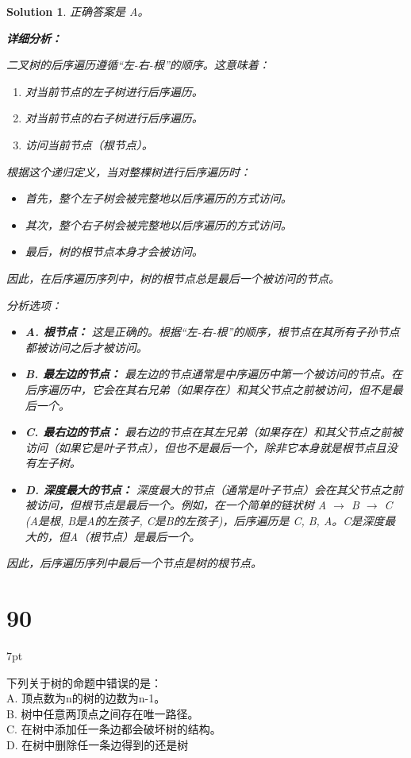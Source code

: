 \documentclass[UTF8]{report}
\newtheorem{solution}{Solution}
\theoremstyle{MyLineTheoremStyle} %
\theoremstyle{MyBlockTheoremStyle} %
\theoremstyle{MySubsubsectionStyle} %
\newenvironment{graybox}{%
        \def\FrameCommand{%
        \hspace{1pt}%
        {\color{gray}\small \vrule width 2pt}%
        {\color{graybox_color}\vrule width 4pt}%
        \colorbox{graybox_color}%
        }%
        \MakeFramed{\advance\hsize-\width\FrameRestore}%
        \noindent\hspace{-4.55pt}%
        \begin{adjustwidth}{}{7pt}%
        \vspace{2pt}\vspace{2pt}%
        }
        {%
        \vspace{2pt}\end{adjustwidth}\endMakeFramed%
        }
\begin{document}
\begin{solution}
正确答案是 A。

\textbf{详细分析：}

二叉树的后序遍历遵循“左-右-根”的顺序。这意味着：
\begin{enumerate}
    \item 对当前节点的左子树进行后序遍历。
    \item 对当前节点的右子树进行后序遍历。
    \item 访问当前节点（根节点）。
\end{enumerate}

根据这个递归定义，当对整棵树进行后序遍历时：
\begin{itemize}
    \item 首先，整个左子树会被完整地以后序遍历的方式访问。
    \item 其次，整个右子树会被完整地以后序遍历的方式访问。
    \item 最后，树的根节点本身才会被访问。
\end{itemize}
因此，在后序遍历序列中，树的根节点总是最后一个被访问的节点。

分析选项：
\begin{itemize}
    \item \textbf{A. 根节点：} 这是正确的。根据“左-右-根”的顺序，根节点在其所有子孙节点都被访问之后才被访问。
    \item \textbf{B. 最左边的节点：} 最左边的节点通常是中序遍历中第一个被访问的节点。在后序遍历中，它会在其右兄弟（如果存在）和其父节点之前被访问，但不是最后一个。
    \item \textbf{C. 最右边的节点：} 最右边的节点在其左兄弟（如果存在）和其父节点之前被访问（如果它是叶子节点），但也不是最后一个，除非它本身就是根节点且没有左子树。
    \item \textbf{D. 深度最大的节点：} 深度最大的节点（通常是叶子节点）会在其父节点之前被访问，但根节点是最后一个。例如，在一个简单的链状树 A $\rightarrow$ B $\rightarrow$ C (A是根, B是A的左孩子, C是B的左孩子)，后序遍历是 C, B, A。C是深度最大的，但A（根节点）是最后一个。
\end{itemize}

因此，后序遍历序列中最后一个节点是树的根节点。
\end{solution}


\section*{90}
\begin{graybox}
下列关于树的命题中错误的是： \\
A. 顶点数为n的树的边数为n-1。 \\
B. 树中任意两顶点之间存在唯一路径。 \\
C. 在树中添加任一条边都会破坏树的结构。 \\
D. 在树中删除任一条边得到的还是树
\end{graybox}
\end{document}
